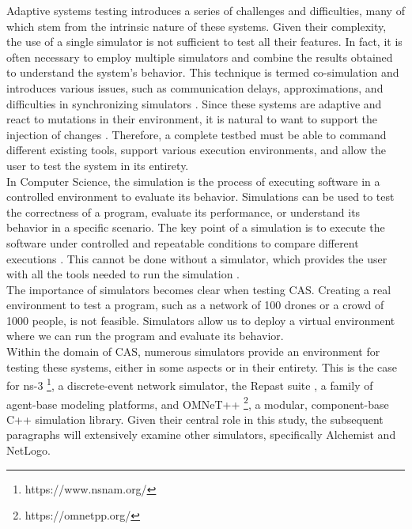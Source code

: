 \documentclass[12pt,a4paper,openright,twoside]{book}
\begin{document}
Adaptive systems testing introduces a series of challenges and difficulties, many of which stem from the intrinsic nature of these systems.
Given their complexity, the use of a single simulator is not sufficient to test all their features.
In fact, it is often necessary to employ multiple simulators and combine the results obtained to understand the system's behavior.
This technique is termed co-simulation and introduces various issues, such as communication delays, approximations, and difficulties in synchronizing simulators \cite{DBLP:journals/simpra/ThuleLGML19}.
Since these systems are adaptive and react to mutations in their environment, it is natural to want to support the injection of changes \cite{DBLP:conf/icac/BrownHHLLSY04}.
Therefore, a complete testbed must be able to command different existing tools, support various execution environments, and allow the user to test the system in its entirety. \\

In Computer Science, the simulation is the process of executing software in a controlled environment to evaluate its behavior.
Simulations can be used to test the correctness of a program, evaluate its performance, or understand its behavior in a specific scenario.
The key point of a simulation is to execute the software under controlled and repeatable conditions to compare different executions  \cite{DBLP:journals/cacm/CollbergP16}.
This cannot be done without a simulator, which provides the user with all the tools needed to run the simulation  \cite{argun2021simulation, bagrodia1998parsec}. \\
The importance of simulators becomes clear when testing \ac{CAS}.
Creating a real environment to test a program, such as a network of 100 drones or a crowd of 1000 people, is not feasible.
Simulators allow us to deploy a virtual environment where we can run the program and evaluate its behavior. \\

Within the domain of \ac{CAS}, numerous simulators provide an environment for testing these systems, either in some aspects or in their entirety.
This is the case for ns-3 \footnote{https://www.nsnam.org/}, a discrete-event network simulator, the Repast suite \cite{North2013}, a family of agent-base modeling platforms, and OMNeT++ \footnote{https://omnetpp.org/}, a modular, component-base C++ simulation library.
Given their central role in this study, the subsequent paragraphs will extensively examine other simulators, specifically Alchemist and NetLogo.
\end{document}
